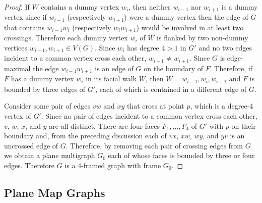 \documentclass{patmorin}
\theoremstyle{plain}
\theoremstyle{definition}
\newcommand{\note}[2]{\noindent{\color{red}[#1:~#2]}}
\DeclareMathOperator{\dist}{dist}
\renewcommand{\le}{\leqslant}
\begin{document}
\begin{proof}
If $W$ contains a dummy vertex $w_i$, then neither $w_{i-1}$ nor $w_{i+1}$ is a dummy vertex since if $w_{i-1}$ (respectively $w_{i+1}$) were a dummy vertex then the edge of $G$ that contains $w_{i-1}w_i$ (respectively $w_iw_{i+1}$) would be involved in at least two crossings.  Therefore each dummy vertex $w_i$ of $W$ is flanked by two non-dummy vertices $w_{i-1},w_{i+1}\in V(G)$.  Since $w_i$ has degree $4>1$ in $G'$ and no two edges incident to a common vertex cross each other, $w_{i-1}\neq w_{i+1}$.  Since $G$ is edge-maximal the edge $w_{i-1}w_{i+1}$ is an edge of $G$ on the boundary of $F$.  Therefore, if $F$ has a dummy vertex $w_i$ in its facial walk $W$, then $W=w_{i-1},w_i,w_{i+1}$ and $F$ is bounded by three edges of $G'$, each of which is contained in a different edge of $G$.


Consider some pair of edges $vw$ and $xy$ that cross at point $p$, which is a degree-4 vertex of $G'$.  Since no pair of edges incident to a common vertex cross each other, $v$, $w$, $x$, and $y$ are all distinct.  There are four faces $F_1,\ldots,F_4$ of $G'$ with $p$ on their boundary and, from the preceding discussion each of $vx$, $xw$, $wy$, and $yv$ is an uncrossed edge of $G$.  Therefore, by removing each pair of crossing edges from $G$ we obtain a plane multigraph $G_0$ each of whose faces is bounded by three or four edges.  Therefore $G$ is a $4$-framed graph with frame $G_0$.
\end{proof}

\subsection{Plane Map Graphs}

\end{document}
